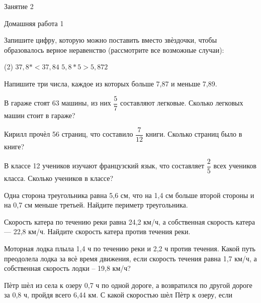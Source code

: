 \begin{class}[number=2]
	\begin{listofex}
		\item Занятие 2
	\end{listofex}
\end{class}

\begin{homework}[number=1]
	\begin{listofex}
		\item Домашняя работа 1
	\end{listofex}
\end{homework}

\begin{class}[number=3]
	\begin{listofex}
		\item Запишите цифру, которую можно поставить вместо звѐздочки, чтобы образовалось
		верное неравенство (рассмотрите все возможные случаи):
		\begin{tasks}(2)
			\task \( 3 7,8* < 3 7,84 \)
			\task \( 5 ,8*5>5 ,872 \)
		\end{tasks}  
		\item Напишите три числа, каждое из которых больше 7,87 и меньше 7,89.
		\item В гараже стоят 63 машины, из них \( \dfrac{5}{7} \) составляют легковые. Сколько легковых машин стоит в гараже?
		\item Кирилл прочѐл 56 страниц, что составило \( \dfrac{7}{12} \) книги. Сколько страниц было в книге?
		\item В классе 12 учеников изучают французский язык, что составляет \( \dfrac{2}{5} \) всех учеников класса. Сколько учеников в классе?
		\item Одна сторона треугольника равна 5,6 см, что на 1,4 см больше второй стороны и на 0,7 см меньше третьей. Найдите периметр треугольника.
		\item Скорость катера по течению реки равна 24,2 км/ч, а собственная скорость катера --- 22,8 км/ч. Найдите скорость катера против течения реки.
		\item Моторная лодка плыла 1,4 ч по течению реки и 2,2 ч против течения. Какой путь преодолела лодка за всѐ время движения, если скорость течения равна 1,7 км/ч, а собственная скорость лодки – 19,8 км/ч?
		\item Пѐтр шѐл из села к озеру 0,7 ч по одной дороге, а возвратился по другой дороге за 0,8 ч, пройдя всего 6,44 км. С какой скоростью шѐл Пѐтр к озеру, если

\end{listofex}
\end{class}

